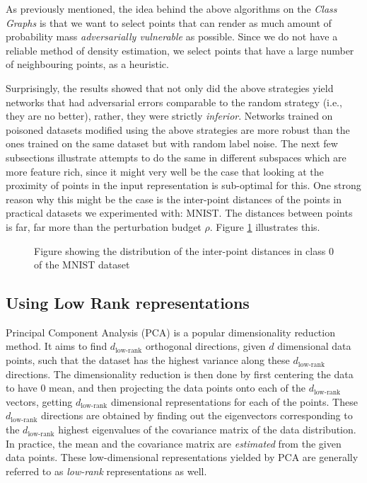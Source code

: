 \documentclass[12pt, oneside]{book}
\begin{document}
As previously mentioned, the idea behind the above algorithms on the \emph{Class
Graphs} is that we want to select points that can render as much amount of
probability mass \emph{adversarially vulnerable} as possible. Since we do not
have a reliable method of density estimation, we select points that have a large
number of neighbouring points, as a heuristic.


Surprisingly, the results showed that not only did the above strategies yield
networks that had adversarial errors comparable to the random strategy (i.e.,
they are no better), rather, they were strictly \emph{inferior}. Networks
trained on poisoned datasets modified using the above strategies are more robust
than the ones trained on the same dataset but with random label noise. The next
few subsections illustrate attempts to do the same in different subspaces which
are more feature rich, since it might very well be the case that looking at the
proximity of points in the input representation is sub-optimal for this. One
strong reason why this might be the case is the inter-point distances of the
points in practical datasets we experimented with: MNIST. The distances between
points is far, far more than the perturbation budget $\rho$. Figure
\ref{fig:inter-point-distances} illustrates this.

\begin{figure}
    \caption{Figure showing the distribution of the inter-point distances in
    class 0 of the MNIST dataset}
    \label{fig:inter-point-distances}
\end{figure}

\subsection{Using Low Rank representations}
Principal Component Analysis (PCA) is a popular dimensionality reduction method.
It aims to find $d_\text{low-rank}$ orthogonal directions, given $d$ dimensional
data points, such that the dataset has the highest variance along these
$d_\text{low-rank}$ directions. The dimensionality reduction is then done by
first centering the data to have $0$ mean, and then projecting the data points
onto each of the $d_\text{low-rank}$ vectors, getting $d_\text{low-rank}$
dimensional representations for each of the points. These $d_\text{low-rank}$
directions are obtained by finding out the eigenvectors corresponding to the
$d_\text{low-rank}$ highest eigenvalues of the covariance matrix of the data
distribution. In practice, the mean and the covariance matrix are
\emph{estimated} from the given data points. These low-dimensional
representations yielded by PCA are generally referred to as \emph{low-rank}
representations as well.
\end{document}
